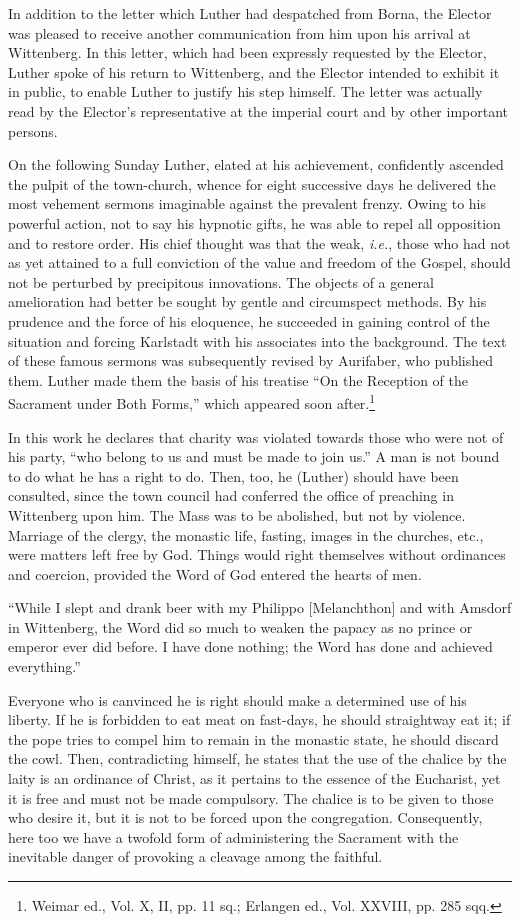 In addition to the letter which Luther had despatched from Borna,
the Elector was pleased to receive another communication from him
upon his arrival at Wittenberg. In this letter, which had been expressly
requested by the Elector, Luther spoke of his return to Wittenberg, and
the Elector intended to exhibit it in public, to enable
Luther to justify his step himself. The letter was actually read by the
Elector’s representative at the imperial court and by other important
persons.

On the following Sunday Luther, elated at his achievement, confidently
ascended the pulpit of the town-church, whence for eight
successive days he delivered the most vehement sermons imaginable
against the prevalent frenzy. Owing to his powerful action, not to
say his hypnotic gifts, he was able to repel all opposition and to restore
order. His chief thought was that the weak, \textit{i.e.}, those who had
not as yet attained to a full conviction of the value and freedom of
the Gospel, should not be perturbed by precipitous innovations. The
objects of a general amelioration had better be sought by gentle and
circumspect methods. By his prudence and the force of his eloquence,
he succeeded in gaining control of the situation and forcing Karlstadt
with his associates into the background. The text of these famous sermons
was subsequently revised by Aurifaber, who published
them. Luther made them the basis of his treatise “On the Reception
of the Sacrament under Both Forms,” which appeared soon after.\footnote
{Weimar ed., Vol. X, II, pp. 11 sq.; Erlangen ed., Vol. XXVIII, pp. 285 sqq.}

In this work he declares that charity was violated towards those who
were not of his party, “who belong to us and must be made to join us.”
A man is not bound to do what he has a right to do. Then, too, he (Luther)
should have been consulted, since the town council had conferred the office
of preaching in Wittenberg upon him. The Mass was to be abolished, but
not by violence. Marriage of the clergy, the monastic life, fasting, images in
the churches, etc., were matters left free by God. Things would right themselves
without ordinances and coercion, provided the Word of God entered
the hearts of men.

“While I slept and drank beer with my Philippo [Melanchthon] and with
Amsdorf in Wittenberg, the Word did so much to weaken the papacy as no
prince or emperor ever did before. I have done nothing; the Word has done
and achieved everything.”

Everyone who is canvinced he is right should make a determined use
of his liberty. If he is forbidden to eat meat on fast-days, he should
straightway eat it; if the pope tries to compel him to remain in the monastic state,
he should discard the cowl. Then, contradicting himself, he states that the
use of the chalice by the laity is an ordinance of Christ, as it pertains to
the essence of the Eucharist, yet it is free and must not be made compulsory.
The chalice is to be given to those who desire it, but it is not to be forced
upon the congregation. Consequently, here too we have a twofold form of
administering the Sacrament with the inevitable danger of provoking a
cleavage among the faithful.

